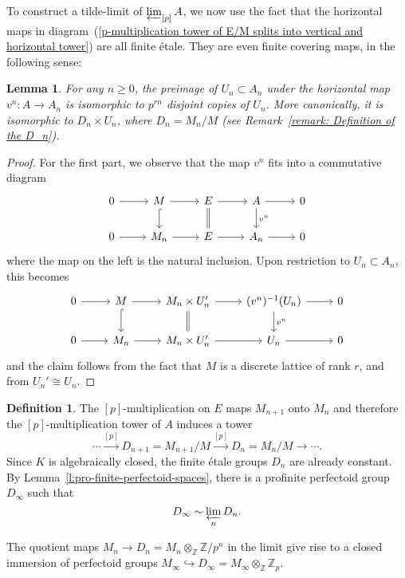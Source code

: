 \documentclass[10pt,oneside]{amsart}
\newtheorem{lemma}[theorem]{Lemma}
\theoremstyle{definition}
\newtheorem{definition}[theorem]{Definition}
\newcommand{\Z}{\mathbb{Z}}
\begin{document}
	To construct a tilde-limit of $\varprojlim_{[p]} A$, we now use the fact that the horizontal maps in diagram~(\ref{p-multiplication tower of E/M splits into vertical and horizontal tower}) are all finite \'etale. They are even finite covering maps, in the following sense:
	\begin{lemma}\label{horizontal map is covering map}
		For any $n\geq 0$, the preimage of $U_n\subset A_n$ under the horizontal map $v^{n}\colon A\rightarrow A_n$ is isomorphic to $p^{rn}$ disjoint copies of $U_n$. More canonically, it is isomorphic to $D_{n}\times U_n$, where $D_n=M_n/M$ (see Remark~\ref{remark: Definition of the D_n}).
	\end{lemma}
	\begin{proof}
		For the first part, we observe that the map $v^n$ fits into a commutative diagram
			\begin{equation}\label{v-tower for E/M}
			\begin{tikzcd}
			0 \arrow[r] & M \arrow[d, hook] \arrow[r] & E \arrow[d,equal] \arrow[r] &  A\arrow[d, "{v^{n}}"] \arrow[r] & 0 \\
			0 \arrow[r] & M_n \arrow[r] & E \arrow[r] & A_n \arrow[r] & 0
			\end{tikzcd}
			\end{equation}
	where the map on the left is the natural inclusion. Upon restriction to $U_n\subset A_n$, this becomes
					\begin{equation}\label{v-tower for E/M-local}
		\begin{tikzcd}
		0 \arrow[r] & M \arrow[d, hook] \arrow[r] & M_n\times U'_n \arrow[d,equal] \arrow[r] &  (v^{n})^{-1}(U_n)\arrow[d, "{v^{n}}"] \arrow[r] & 0 \\
		0 \arrow[r] & M_n \arrow[r] & M_n\times U'_n \arrow[r] & U_n \arrow[r] & 0
		\end{tikzcd}
		\end{equation}
	and the claim follows from the fact that $M$ is a discrete lattice of rank $r$, and from $U_n'\cong U_n$.
	\end{proof}
	\begin{definition}
The $[p]$-multiplication on $E$ maps $M_{n+1}$ onto $M_n$ and therefore the $[p]$-multiplication tower of $A$ induces a tower
 \[\cdots \xrightarrow{[p]}D_{n+1}=M_{n+1}/M\xrightarrow{[p]}D_n=M_n/M\rightarrow\cdots.\]
  Since $K$ is algebraically closed, the finite \'etale groups $D_n$ are already constant.  By Lemma~\ref{l:pro-finite-perfectoid-spaces}, there is a profinite perfectoid group $D_\infty$ such that
  \[D_\infty\sim \varprojlim_n D_n.\]
 \end{definition}
The quotient maps $M_n\to D_n=M_n\otimes_\Z \Z/p^n$ in the limit give rise to a closed immersion of perfectoid groups $M_\infty\hookrightarrow D_\infty= M_\infty\otimes_{\Z}\Z_p$.
\end{document}
